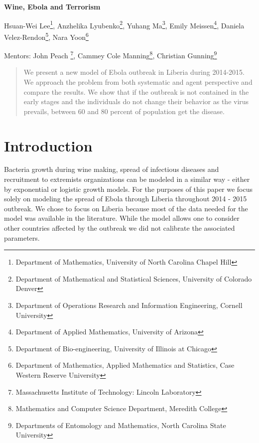 \documentclass[10pt]{article}
\begin{document}
 

\centerline{\large \bf Wine, Ebola and Terrorism}

\vspace{.1truein}

\def\thefootnote{\arabic{footnote}}
\begin{center}
  Hsuan-Wei Lee\footnote{Department of Mathematics, University of North Carolina Chapel Hill},
  Anzhelika Lyubenko\footnote{Department of Mathematical and Statistical Sciences, University of Colorado Denver},
  Yuhang Ma\footnote{Department of Operations Research and Information Engineering, Cornell University},
  Emily Meissen\footnote{Department of Applied Mathematics, University of Arizona},
  Daniela Velez-Rendon\footnote{Department of Bio-engineering, University of Illinois at Chicago},
    Nara Yoon\footnote{
Department of Mathematics, Applied Mathematics and Statistics, Case Western Reserve University}
\end{center}


\begin{center}
Mentors: John Peach \footnote{Massachusetts Institute of Technology: Lincoln Laboratory}, Cammey Cole Manning\footnote{Mathematics and Computer Science Department, Meredith College},
Christian Gunning\footnote{Departments of Entomology and Mathematics, North Carolina State University}
\end{center}

\begin{abstract}
\noindent We present a new model of Ebola outbreak in Liberia during 2014-2015. We approach the problem from both systematic and agent perspective and compare the results. We show that if the outbreak is not contained in the early stages and the individuals do not change their behavior as the virus prevails, between 60 and 80 percent of population get the disease. 
\end{abstract}
%
%
\section{Introduction}
Bacteria growth during wine making, spread of infectious diseases and recruitment to extremists organizations can be modeled in a similar way - either by exponential or logistic growth models. For the purposes of this paper we focus solely on modeling the spread of Ebola through Liberia throughout 2014 - 2015 outbreak. We chose to focus on Liberia because most of the data needed for the model was available in the literature. While the model allows one to consider other countries affected by the outbreak we did not calibrate the associated parameters. 
\end{document}
